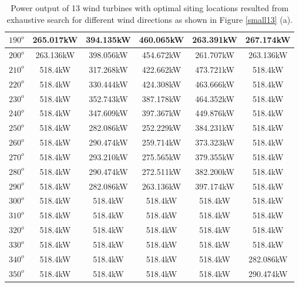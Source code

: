 \begin{table}[H]
\begin{tabular}{|c|c|c|c|c|c|}
        		$190^o$	& 265.017kW	& 394.135kW	& 460.065kW	& 263.391kW	& 267.174kW	\\ \hline
        		$200^o$	& 263.136kW	& 398.056kW	& 454.672kW	& 261.707kW	& 263.136kW	\\ \hline
        		$210^o$	& 518.4kW	& 317.268kW	& 422.662kW	& 473.721kW	& 518.4kW	\\ \hline
        		$220^o$	& 518.4kW	& 330.444kW	& 424.308kW	& 463.666kW	& 518.4kW	\\ \hline
        		$230^o$	& 518.4kW	& 352.743kW	& 387.178kW	& 464.352kW	& 518.4kW	\\ \hline
        		$240^o$	& 518.4kW	& 347.609kW	& 397.367kW	& 449.876kW	& 518.4kW	\\ \hline
        		$250^o$	& 518.4kW	& 282.086kW	& 252.229kW	& 384.231kW	& 518.4kW	\\ \hline
        		$260^o$	& 518.4kW	& 290.474kW	& 259.714kW	& 373.323kW	& 518.4kW	\\ \hline
        		$270^o$	& 518.4kW	& 293.210kW	& 275.565kW	& 379.355kW	& 518.4kW	\\ \hline
        		$280^o$	& 518.4kW	& 290.474kW	& 272.511kW	& 382.200kW	& 518.4kW	\\ \hline
        		$290^o$	& 518.4kW	& 282.086kW	& 263.136kW	& 397.174kW	& 518.4kW	\\ \hline
        		$300^o$	& 518.4kW	& 518.4kW	& 518.4kW	& 518.4kW	& 518.4kW	\\ \hline
        		$310^o$	& 518.4kW	& 518.4kW	& 518.4kW	& 518.4kW	& 518.4kW	\\ \hline
        		$320^o$	& 518.4kW	& 518.4kW	& 518.4kW	& 518.4kW	& 518.4kW	\\ \hline
        		$330^o$	& 518.4kW	& 518.4kW	& 518.4kW	& 518.4kW	& 518.4kW	\\ \hline
        		$340^o$	& 518.4kW	& 518.4kW	& 518.4kW	& 518.4kW	& 282.086kW	\\ \hline
        		$350^o$	& 518.4kW	& 518.4kW	& 518.4kW	& 518.4kW	& 290.474kW	\\ \hline
        	\end{tabular}
        	\caption{Power output of 13 wind turbines with optimal siting locations resulted from exhaustive search for different wind directions as shown in Figure \ref{small13} (a).}
        	\label{table13a}
        \end{table}
